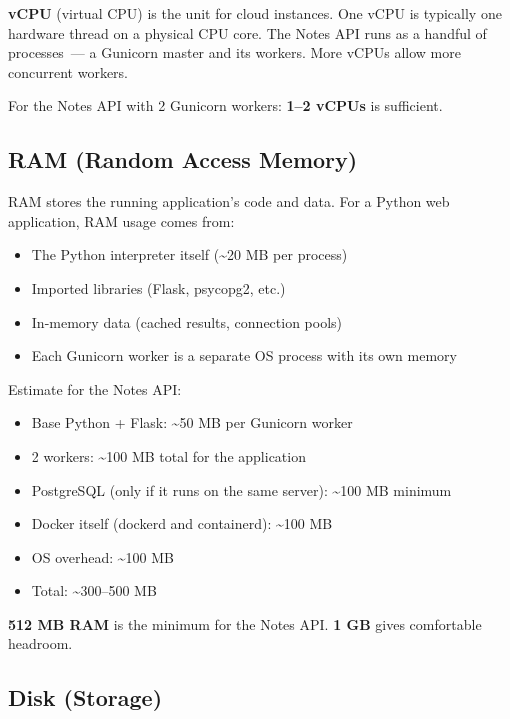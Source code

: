 \noindent{}\textbf{vCPU} (virtual CPU) is the unit for cloud instances. One vCPU is typically one hardware thread on a physical CPU core. The Notes API runs as a handful of processes~--- a Gunicorn master and its workers. More vCPUs allow more concurrent workers.

For the Notes API with 2 Gunicorn workers: \textbf{1--2 vCPUs} is sufficient.

\subsection*{RAM (Random Access Memory)}\label{20-server-fundamentals:ram-random-access-memory}

RAM stores the running application's code and data. For a Python web application, RAM usage comes from:

\begin{itemize}
\tightlist
\item
  The Python interpreter itself (\textasciitilde20 MB per process)
\item
  Imported libraries (Flask, psycopg2, etc.)
\item
  In-memory data (cached results, connection pools)
\item
  Each Gunicorn worker is a separate OS process with its own memory
\end{itemize}

\noindent{}Estimate for the Notes API:

\begin{itemize}
\tightlist
\item
  Base Python + Flask: \textasciitilde50 MB per Gunicorn worker
\item
  2 workers: \textasciitilde100 MB total for the application
\item
  PostgreSQL (only if it runs on the same server): \textasciitilde100 MB minimum
\item
  Docker itself (dockerd and containerd): \textasciitilde100 MB
\item
  OS overhead: \textasciitilde100 MB
\item
  Total: \textasciitilde300--500 MB
\end{itemize}

\noindent{}\textbf{512 MB RAM} is the minimum for the Notes API. \textbf{1 GB} gives comfortable headroom.

\subsection*{Disk (Storage)}\label{20-server-fundamentals:disk-storage}

